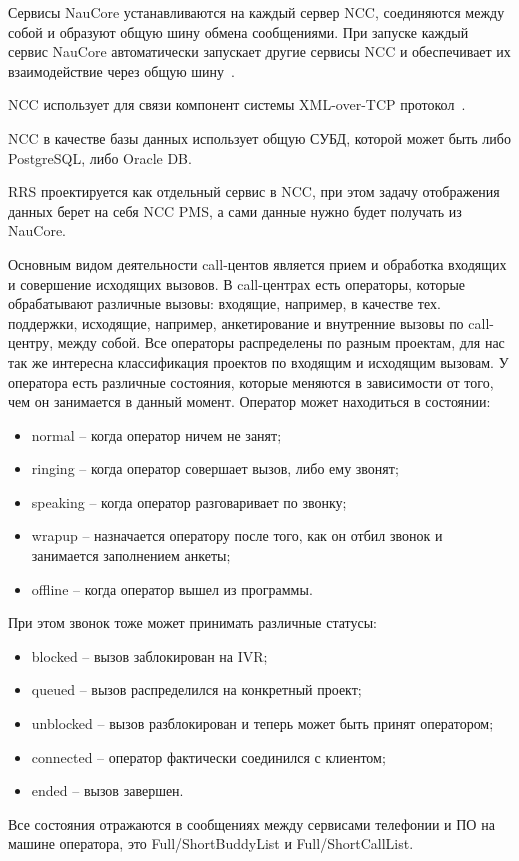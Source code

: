 Сервисы NauCore устанавливаются на каждый сервер NCC,
соединяются между собой и образуют общую шину обмена сообщениями.
При запуске каждый сервис NauCore автоматически запускает другие сервисы NCC
и обеспечивает их взаимодействие через общую шину~\cite{doc:core}.

NCC использует для связи компонент системы XML-over-TCP протокол~\cite{doc:portsndproto}.

NCC в качестве базы данных использует общую СУБД, которой может быть либо PostgreSQL, либо Oracle DB.

RRS проектируется как отдельный сервис в NCC,
при этом задачу отображения данных берет на себя NCC PMS,
а сами данные нужно будет получать из NauCore.

Основным видом деятельности call-центов является прием и обработка входящих и совершение исходящих вызовов.
В call-центрах есть операторы, которые обрабатывают различные вызовы: входящие, например, в качестве
тех. поддержки, исходящие, например, анкетирование и внутренние вызовы по call-центру,
между собой.
Все операторы распределены по разным проектам, для нас так же интересна классификация проектов по входящим и исходящим вызовам.
У оператора есть различные состояния, которые меняются в зависимости от того, чем он занимается в данный момент.
Оператор может находиться в состоянии:
\begin{itemize}
    \item normal – когда оператор ничем не занят;
    \item ringing – когда оператор совершает вызов, либо ему звонят;
    \item speaking – когда оператор разговаривает по звонку;
    \item wrapup – назначается оператору после того, как он отбил звонок и занимается заполнением анкеты;
    \item offline – когда оператор вышел из программы.
\end{itemize}

При этом звонок тоже может принимать различные статусы:
\begin{itemize}
    \item blocked – вызов заблокирован на IVR;
    \item queued – вызов распределился на конкретный проект;
    \item unblocked – вызов разблокирован и теперь может быть принят оператором;
    \item connected – оператор фактически соединился с клиентом;
    \item ended – вызов завершен.
\end{itemize}
Все состояния отражаются в сообщениях между сервисами телефонии и ПО на машине оператора, это Full/ShortBuddyList и Full/ShortCallList.

